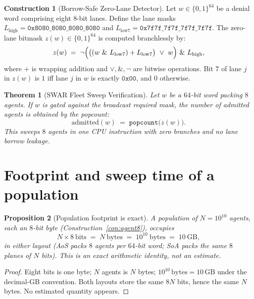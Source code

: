 \documentclass[11pt,oneside]{book}
\theoremstyle{definition}
\newtheorem{construction}{Construction}[chapter]
\theoremstyle{plain}
\newtheorem{theorem}{Theorem}[chapter]
\newtheorem{proposition}[theorem]{Proposition}
\theoremstyle{remark}
\newcommand{\code}[1]{\texttt{#1}}
\begin{document}
\begin{construction}[Borrow-Safe Zero-Lane Detector]\label{con:swar}
Let $w\in\{0,1\}^{64}$ be a denial word comprising eight $8$-bit lanes. Define the lane masks
$L_{\text{high}} = \code{0x8080\_8080\_8080\_8080}$ and $L_{\text{low7}} = \code{0x7f7f\_7f7f\_7f7f\_7f7f}$. The
zero-lane bitmask $z(w)\in\{0,1\}^{64}$ is computed branchlessly by:
\begin{equation}\label{eq:swar}
z(w)\;=\;\lnot\Bigl(\bigl((w\ \&\ L_{\text{low7}}) + L_{\text{low7}}\bigr) \ \lor\ w\Bigr)\ \&\ L_{\text{high}},
\end{equation}
where $+$ is wrapping addition and $\lor, \&, \lnot$ are bitwise operations. Bit $7$ of lane $j$ in $z(w)$ is $1$ iff lane $j$ in $w$ is exactly $\code{0x00}$, and $0$ otherwise.
\end{construction}

\begin{theorem}[SWAR Fleet Sweep Verification]\label{thm:swar-verify}
Let $w$ be a $64$-bit word packing $8$ agents. If $w$ is gated against the broadcast required mask, the number of admitted agents is obtained by the popcount:
\[
\text{admitted}(w)\;=\;\code{popcount}\bigl(z(w)\bigr).
\]
This sweeps $8$ agents in one CPU instruction with zero branches and no lane borrow leakage.
\end{theorem}

\section{Footprint and sweep time of a population}

\begin{proposition}[Population footprint is exact]\label{prop:footprint}
A population of $N=10^{10}$ agents, each an $8$-bit byte (Construction~\ref{con:agent8}), occupies
\[
N\times 8\ \text{bits}\;=\;N\ \text{bytes}\;=\;10^{10}\ \text{bytes}\;=\;10\ \mathrm{GB},
\]
in either layout (AoS packs $8$ agents per $64$-bit word; SoA packs the same $8$ planes of $N$
bits). This is an exact arithmetic identity, not an estimate.
\end{proposition}

\begin{proof}
Eight bits is one byte; $N$ agents is $N$ bytes; $10^{10}\,\text{bytes}=10\,\mathrm{GB}$ under the
decimal-GB convention. Both layouts store the same $8N$ bits, hence the same $N$ bytes. No
estimated quantity appears.
\end{proof}
\end{document}
